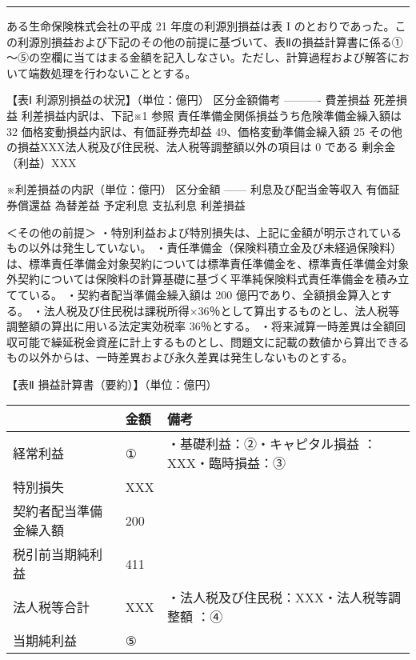 \documentclass[report,gutter=10mm,fore-edge=10mm,uplatex,dvipdfmx]{jlreq}
\begin{document}
\begin{center}\rule{0.5\linewidth}{0.5pt}\end{center}


ある生命保険株式会社の平成 21 年度の利源別損益は表 I
のとおりであった。この利源別損益および下記のその他の前提に基づいて、表Ⅱの損益計算書に係る①～⑤の空欄に当てはまる金額を記入しなさい。ただし、計算過程および解答において端数処理を行わないこととする。

【表Ⅰ 利源別損益の状況】（単位：億円）
\textbar 区分\textbar 金額\textbar 備考\textbar{}
\textbar---\textbar---\textbar----\textbar{}
\textbar 費差損益\textbar\textbar{}
\textbar 死差損益\textbar\textbar{}
\textbar 利差損益\textbar 内訳は、下記※1 参照\textbar{}
\textbar 責任準備金関係損益\textbar うち危険準備金繰入額は 32
\textbar 価格変動損益\textbar 内訳は、有価証券売却益
49、価格変動準備金繰入額 25\textbar{}
\textbar その他の損益\textbar XXX\textbar 法人税及び住民税、法人税等調整額以外の項目は
0 である\textbar{} \textbar 剰余金（利益）\textbar XXX\textbar\textbar{}

※利差損益の内訳（単位：億円） \textbar 区分\textbar 金額\textbar{}
\textbar---\textbar---\textbar{}
\textbar 利息及び配当金等収入\textbar{}
\textbar 有価証券償還益\textbar{}
\textbar 為替差益\textbar{}
\textbar 予定利息\textbar{}
\textbar 支払利息\textbar{}
\textbar 利差損益\textbar{}

＜その他の前提＞
・特別利益および特別損失は、上記に金額が明示されているもの以外は発生していない。
・責任準備金（保険料積立金及び未経過保険料）は、標準責任準備金対象契約については標準責任準備金を、標準責任準備金対象外契約については保険料の計算基礎に基づく平準純保険料式責任準備金を積み立てている。
・契約者配当準備金繰入額は 200 億円であり、全額損金算入とする。
・法人税及び住民税は課税所得×36％として算出するものとし、法人税等調整額の算出に用いる法定実効税率
36％とする。
・将来減算一時差異は全額回収可能で繰延税金資産に計上するものとし、問題文に記載の数値から算出できるもの以外からは、一時差異および永久差異は発生しないものとする。

【表Ⅱ 損益計算書（要約）】（単位：億円）

\begin{longtable}[]{@{}lll@{}}
\toprule
& 金額 & 備考\tabularnewline
\midrule
\endhead
経常利益 & ① & ・基礎利益：②・キャピタル損益
：XXX・臨時損益：③\tabularnewline
特別損失 & XXX &\tabularnewline
契約者配当準備金繰入額 & 200 &\tabularnewline
税引前当期純利益 & 411 &\tabularnewline
法人税等合計 & XXX & ・法人税及び住民税：XXX・法人税等調整額
：④\tabularnewline
当期純利益 & ⑤ &\tabularnewline
\bottomrule
\end{longtable}
\end{document}
